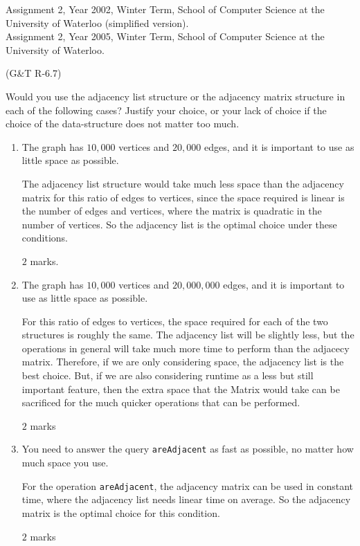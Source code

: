 \begin{usage}
Assignment 2, Year 2002, Winter Term, School of Computer Science at the University of Waterloo (simplified version).\\
Assignment 2, Year 2005, Winter Term, School of Computer Science at the University of Waterloo.
\end{usage}
\begin{authorship}
(G\&T R-6.7)
\end{authorship}

Would you use the adjacency list structure or the adjacency matrix
structure in each of the following cases?
%
Justify your choice, or your lack of choice if the choice of the
data-structure does not matter too much.


\begin{enumerate}

\item The graph has $10,000$ vertices and $20,000$ edges, and it is
important to use as little space as possible.
\begin{solution}
The adjacency list structure would take much less space than the
adjacency matrix for this ratio of edges to vertices, since the space
required is linear is the number of edges and vertices, where the
matrix is quadratic in the number of vertices. So the adjacency list
is the optimal choice under these conditions.
\end{solution}
\begin{markingScheme}
$2$ marks.
\end{markingScheme}


\item The graph has $10,000$ vertices and $20,000,000$ edges, and it is
important to use as little space as possible.
\begin{solution}
For this ratio of edges to vertices, the space required for each of
the two structures is roughly the same.
%
The adjacency list will be slightly less, but the operations in
general will take much more time to perform than the adjacecy
matrix.
%
Therefore, if we are only considering space, the adjacency list is the
best choice.
%
But, if we are also considering runtime as a less but still important
feature, then the extra space that the Matrix would take can be
sacrificed for the much quicker operations that can be performed.
\end{solution}
\begin{markingScheme}
$2$ marks
\end{markingScheme}

\item You need to answer the query {\tt areAdjacent} as fast as
possible, no matter how much space you use.
\begin{solution}
For the operation {\tt areAdjacent}, the adjacency matrix can be used
in constant time, where the adjacency list needs linear time on
average.
%
So the adjacency matrix is the optimal choice for this condition.
\end{solution}
\begin{markingScheme}
$2$ marks
\end{markingScheme}

\end{enumerate}
